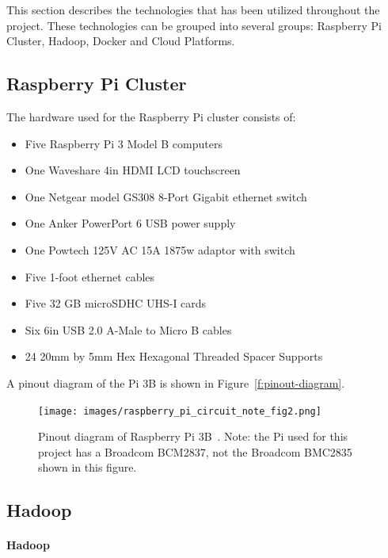 This section describes the technologies that has been utilized throughout 
the project. These technologies can be grouped into several groups: 
Raspberry Pi Cluster, Hadoop, Docker and Cloud Platforms.

\subsection{Raspberry Pi Cluster}

The hardware used for the Raspberry Pi cluster consists of:

\begin{itemize}
\item Five Raspberry Pi 3 Model B computers 
\item One Waveshare 4in HDMI LCD touchscreen
\item One Netgear model GS308 8-Port Gigabit ethernet switch
\item One Anker PowerPort 6 USB power supply
\item One Powtech 125V AC 15A 1875w adaptor with switch
\item Five 1-foot ethernet cables
\item Five 32 GB microSDHC UHS-I cards
\item Six 6in USB 2.0 A-Male to Micro B cables
\item 24 20mm by 5mm Hex Hexagonal Threaded Spacer Supports
\end{itemize}

A pinout diagram of the Pi 3B is shown in Figure~\ref{f:pinout-diagram}.

\begin{figure}[!ht]
  \centering\texttt{[image: images/raspberry\_pi\_circuit\_note\_fig2.png]}
  \caption{Pinout diagram of Raspberry Pi 3B~\cite{hid-sp18-419-pi-pinout}. Note: the Pi used for this project has a Broadcom BCM2837, not the Broadcom BMC2835 shown in this figure.}\label{f:pinout-digram}
\end{figure}

\subsection{Hadoop}

\paragraph{Hadoop}
